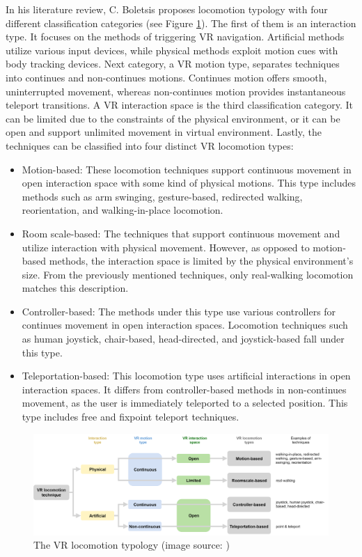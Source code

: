 In his literature review, C. Boletsis proposes locomotion typology with four different classification categories (see Figure \ref{fig:TYPOLOGY}). The first of them is an interaction type. It focuses on the methods of triggering VR navigation. Artificial methods utilize various input devices, while physical methods exploit motion cues with body tracking devices. Next category, a VR motion type, separates techniques into continues and non-continues motions. Continues motion offers smooth, uninterrupted movement, whereas non-continues motion provides instantaneous teleport transitions. A VR interaction space is the third classification category. It can be limited due to the constraints of the physical environment, or it can be open and support unlimited movement in virtual environment. Lastly, the techniques can be classified into four distinct VR locomotion types:

\begin{itemize}
\item Motion-based: These locomotion techniques support continuous movement in open interaction space with some kind of physical motions. This type includes methods such as arm swinging, gesture-based, redirected walking, reorientation, and walking-in-place locomotion.
\item Room scale-based: The techniques that support continuous movement and utilize interaction with physical movement. However, as opposed to motion-based methods, the interaction space is limited by the physical environment's size. From the previously mentioned techniques, only real-walking locomotion matches this description.
\item Controller-based: The methods under this type use various controllers for continues movement in open interaction spaces. Locomotion techniques such as human joystick, chair-based, head-directed, and joystick-based fall under this type.
\item Teleportation-based: This locomotion type uses artificial interactions in open interaction spaces. It differs from controller-based methods in non-continues movement, as the user is immediately teleported to a selected position. This type includes free and fixpoint teleport techniques.
\end{itemize}

\begin{figure}[th]
\centering
\includegraphics[width=1\textwidth]{img/locomotion_typology.png}
\caption{The VR locomotion typology (image source: \cite{LOCOMOTIONREVIEW})}
\label{fig:TYPOLOGY}
\end{figure}

